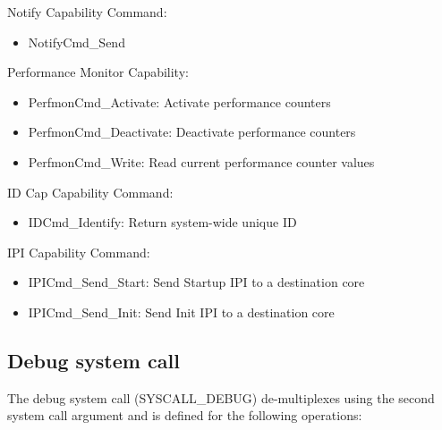 \documentclass[a4paper,11pt,twoside]{report}
\newcommand{\brief}[1]{##1\\}
\begin{document}
{{Notify Capability Command:
\begin{itemize}
\item NotifyCmd\_Send
\end{itemize}

Performance Monitor Capability:
\begin{itemize}
\item PerfmonCmd\_Activate: Activate performance counters
\item PerfmonCmd\_Deactivate: Deactivate performance counters
\item PerfmonCmd\_Write: Read current performance counter values
\end{itemize}

ID Cap Capability Command:
\begin{itemize}
\item IDCmd\_Identify: Return system-wide unique ID
\end{itemize}

IPI Capability Command:
\begin{itemize}
\item IPICmd\_Send\_Start: Send Startup IPI to a destination core
\item IPICmd\_Send\_Init: Send Init IPI to a destination core
\end{itemize}

\subsection{Debug system call}

The debug system call (SYSCALL\_DEBUG) de-multiplexes using the second system
call argument and is defined for the following operations:





}}
\end{document}
